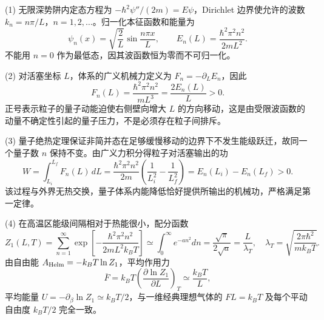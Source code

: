 (1) 无限深势阱内定态方程为 \(-\hbar^2\psi''/(2m)=E\psi\)，Dirichlet 边界使允许的波数 \(k_n=n\pi/L\)，\(n=1,2,\ldots\)。归一化本征函数和能量为
\[
\psi_n(x)=\sqrt{\frac2L}\sin\frac{n\pi x}{L},\qquad
E_n(L)=\frac{\hbar^2\pi^2n^2}{2mL^2}.
\]
不能用 \(n=0\) 作为最低态，因其波函数恒为零而不可归一化。

(2) 对活塞坐标 \(L\)，体系的广义机械力定义为 \(F_n=-\partial_LE_n\)，因此
\[
F_n(L)=\frac{\hbar^2\pi^2n^2}{mL^3}=\frac{2E_n(L)}L>0.
\]
正号表示粒子的量子动能迫使右侧壁向增大 \(L\) 的方向移动，这是由受限波函数的动量不确定性引起的量子压力，不是必须存在粒子间排斥。

(3) 量子绝热定理保证非简并态在足够缓慢移动的边界下不发生能级跃迁，故同一个量子数 \(n\) 保持不变。由广义力积分得粒子对活塞输出的功
\[
W=\int_{L_i}^{L_f}F_n(L)\,dL
=\frac{\hbar^2\pi^2n^2}{2m}
\left(\frac1{L_i^2}-\frac1{L_f^2}\right)
=E_n(L_i)-E_n(L_f)>0.
\]
该过程与外界无热交换，量子体系内能降低恰好提供所输出的机械功，严格满足第一定律。

(4) 在高温区能级间隔相对于热能很小，配分函数
\[
Z_1(L,T)=\sum_{n=1}^\infty
\exp\left[-\frac{\hbar^2\pi^2n^2}{2mL^2k_BT}\right]
\simeq\int_0^\infty e^{-a n^2}dn
=\frac{\sqrt\pi}{2\sqrt a}=\frac L{\lambda_T},
\quad \lambda_T=\sqrt{\frac{2\pi\hbar^2}{mk_BT}}.
\]
由自由能 \(A_{\rm Helm}=-k_BT\ln Z_1\)，平均作用力
\[
\overline F=k_BT\left(\frac{\partial\ln Z_1}{\partial L}\right)_T
\simeq\frac{k_BT}{L},
\]
平均能量 \(U=-\partial_\beta\ln Z_1\simeq k_BT/2\)，与一维经典理想气体的 \(FL=k_BT\) 及每个平动自由度 \(k_BT/2\) 完全一致。
